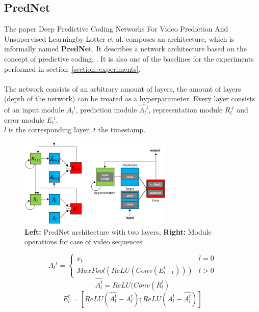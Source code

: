  \subsection{PredNet}
  The paper \glqq Deep Predictive Coding Networks For Video Prediction And Unsupervised Learning\grqq by Lotter et al. \cite{Lotter2016} composes an architecture, which is informally named
  \textbf{PredNet}. It describes a network architecture based on the concept of \glqq predictive coding\grqq \cite{Rao1999}, \cite{Friston2005}. It is also one of the baselines for the experiments performed
  in section~\ref{section::experiments}.
  \\\\  
  The network consists of an arbitrary amount of layers, the amount of layers (depth of the network) can be treated as a hyperparameter. Every layer consists
  of an input module $A{_l}^t$, prediction module $\hat{A{_l}^t}$, representation module $R{_l}^t$ and error module $E{_l}^t$.\\
  $l$ is the corresponding layer, $t$ the timestamp.
  \begin{figure}[H]
   \includegraphics[width=0.65\textwidth]{../Images/lotter.png}
   \centering
   \caption{\textbf{Left:} PredNet architecture with two layers, \textbf{Right:} \glqq Module operations for case of video sequences\grqq \cite{Lotter2016}}
   \label{fig:lotter_architecture}
  \end{figure}
  \begin{equation}
   A{_l}^t = \begin{cases} x_t & l = 0 \\ MaxPool(ReLU(Conv(E_{l-1}^t))) & l > 0 \end{cases}
  \end{equation}
  \begin{equation}
   \hat{A_l^t} = ReLU(Conv(R_l^t)
  \end{equation}
  \begin{equation}
   E_l^t = [ReLU(\hat{A_l^t} - A_l^t); ReLU(A_l^t - \hat{A_l^t})]
  \end{equation}
